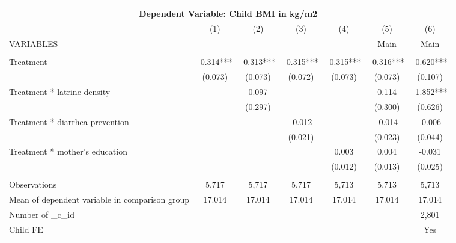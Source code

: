 \begin{tabular}{lcccccc}
\multicolumn{7}{c}{Dependent Variable: Child BMI in kg/m2} \\ \hline
 & (1) & (2) & (3) & (4) & (5) & (6) \\
VARIABLES &  &  &  &  & Main & Main \\ \hline
 &  &  &  &  &  &  \\
Treatment & -0.314*** & -0.313*** & -0.315*** & -0.315*** & -0.316*** & -0.620*** \\
 & (0.073) & (0.073) & (0.072) & (0.073) & (0.073) & (0.107) \\
Treatment * latrine density &  & 0.097 &  &  & 0.114 & -1.852*** \\
 &  & (0.297) &  &  & (0.300) & (0.626) \\
Treatment * diarrhea prevention &  &  & -0.012 &  & -0.014 & -0.006 \\
 &  &  & (0.021) &  & (0.023) & (0.044) \\
Treatment * mother's education &  &  &  & 0.003 & 0.004 & -0.031 \\
 &  &  &  & (0.012) & (0.013) & (0.025) \\
 &  &  &  &  &  &  \\
Observations & 5,717 & 5,717 & 5,717 & 5,713 & 5,713 & 5,713 \\
Mean of dependent variable in comparison group & 17.014 & 17.014 & 17.014 & 17.014 & 17.014 & 17.014 \\
Number of \_c\_id &  &  &  &  &  & 2,801 \\
 Child FE &  &  &  &  &  & Yes \\ \hline
\end{tabular}
